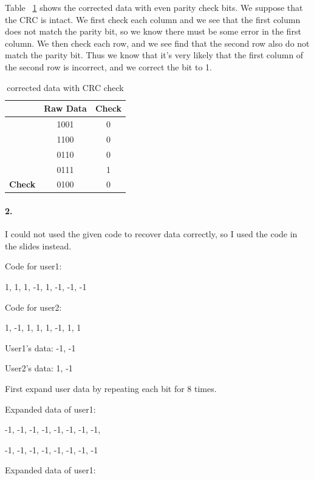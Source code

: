 \documentclass{article}
\begin{document}
  Table ~\ref{tab:corrected} shows the corrected data with even parity check bits. We suppose that the CRC is intact. We first check each column and we see that the first column does not match the parity bit, so we know there must be some error in the first column. We then check each row, and we see find that the second row also do not match the parity bit. Thus we know that it's very likely that the first column of the second row is incorrect, and we correct the bit to 1. 
  \begin{table}[h!]
    \begin{center}
      \caption{corrected data with CRC check}
      \label{tab:corrected}
      \begin{tabular}{c|c|c} %
        \toprule
        & \textbf{Raw Data} & \textbf{Check}\\
        \hline
        &1001&0\\
        \hline
        &1100&0\\
        \hline
        &0110&0\\
        \hline
        &0111&1\\
        \hline
        \textbf{Check}&0100&0\\
        \bottomrule
      \end{tabular}
    \end{center}
  \end{table}

\paragraph{2. } I could not used the given code to recover data correctly, so I used the code in the slides instead.

Code for user1:

 1,  1,  1, -1,  1, -1, -1, -1

Code for user2:

 1, -1,  1,  1,  1, -1,  1,  1

User1's data: -1, -1

User2's data: 1, -1

First expand user data by repeating each bit for 8 times. 

Expanded data of user1:

-1, -1, -1, -1, -1, -1, -1, -1,

-1, -1, -1, -1, -1, -1, -1, -1

Expanded data of user1:
\end{document}
